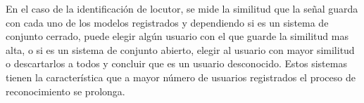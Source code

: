En el caso de la identificaci\'on de locutor, se mide la similitud que la señal guarda con cada uno de los modelos registrados y dependiendo si es un sistema de conjunto cerrado, puede elegir alg\'un usuario con el que guarde la similitud mas alta, o si es un sistema de conjunto abierto, elegir al usuario con mayor similitud o descartarlos a todos y concluir que es un usuario desconocido. Estos sistemas tienen la caracter\'istica que a mayor n\'umero de usuarios registrados el proceso de reconocimiento se prolonga.\\








